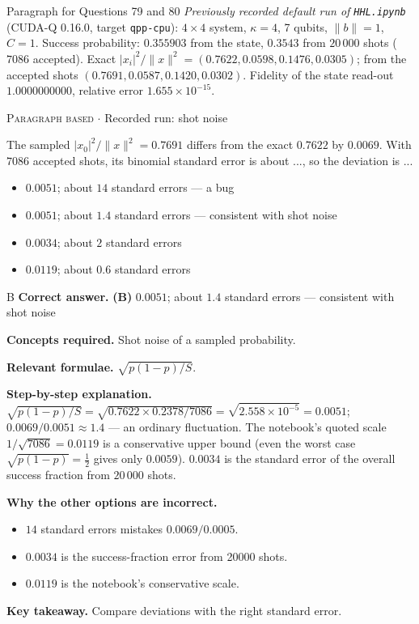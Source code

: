 \documentclass[11pt,a4paper]{article}
\newcommand{\optlabel}[1]{\textbf{(#1)}}
\newcommand{\correctlabel}[1]{\textcolor{okgreen}{\textbf{(#1)}\,\ding{51}}}
\newenvironment{qitem}[1]{\begin{list}{}{\setlength{\leftmargin}{3.3em}\setlength{\labelwidth}{3.1em}%
  \setlength{\labelsep}{0.2em}\setlength{\topsep}{3pt}\setlength{\parsep}{3pt}}\item[\textbf{Q.#1}\hfill]}{\end{list}}
\newcommand{\qsep}{\par\vspace{2pt}{\color{black!15}\hrule}\vspace{4pt}}
\newcommand{\qmeta}[2]{{\footnotesize\color{black!60}\textsc{#1} \;$\cdot$\; #2}\par}
\begin{document}
\begin{passagebox}{Paragraph for Questions 79 and 80}
\emph{Previously recorded default run of \texttt{HHL.ipynb}} (CUDA-Q 0.16.0, target \texttt{qpp-cpu}): $4\times4$ system, $\kappa = 4$, 7 qubits, $\|b\| = 1$, $C = 1$.
Success probability: $0.355903$ from the state, $0.3543$ from $20\,000$ shots ($7086$ accepted). Exact $|x_i|^2/\|x\|^2 = (0.7622, 0.0598, 0.1476, 0.0305)$; from the accepted shots
$(0.7691, 0.0587, 0.1420, 0.0302)$. Fidelity of the state read-out $1.0000000000$, relative error $1.655\times10^{-15}$.
\end{passagebox}
\begin{qitem}{79}
\qmeta{Paragraph based}{Recorded run: shot noise}
The sampled $|x_0|^2/\|x\|^2 = 0.7691$ differs from the exact $0.7622$ by $0.0069$. With $7086$ accepted shots, its binomial standard error is about ..., so the deviation is ...
\begin{itemize}[leftmargin=2.6em, labelsep=0.4em, itemsep=2pt, topsep=3pt]
\item[\optlabel{A}] $0.0051$; about $14$ standard errors --- a bug
\item[\correctlabel{B}] $0.0051$; about $1.4$ standard errors --- consistent with shot noise
\item[\optlabel{C}] $0.0034$; about $2$ standard errors
\item[\optlabel{D}] $0.0119$; about $0.6$ standard errors
\end{itemize}
\end{qitem}
\begin{solbox}{B}
\textbf{\color{brand}Correct answer.} \textcolor{okgreen}{\textbf{(B)}} $0.0051$; about $1.4$ standard errors --- consistent with shot noise

\textbf{\color{brand}Concepts required.} Shot noise of a sampled probability.

\textbf{\color{brand}Relevant formulae.} $\sqrt{p(1-p)/S}$.

\textbf{\color{brand}Step-by-step explanation.} $\sqrt{p(1 - p)/S} = \sqrt{0.7622\times0.2378/7086} = \sqrt{2.558\times10^{-5}} = 0.0051$; $0.0069/0.0051 \approx 1.4$ --- an ordinary fluctuation. The notebook's quoted scale $1/\sqrt{7086} = 0.0119$ is a conservative
upper bound (even the worst case $\sqrt{p(1 - p)} = \tfrac12$ gives only $0.0059$). $0.0034$ is the standard error of the overall success fraction from $20\,000$ shots.

\textbf{\color{brand}Why the other options are incorrect.}
\begin{itemize}[leftmargin=2.4em, itemsep=1pt, topsep=2pt]
\item[\textbf{(A)}] $14$ standard errors mistakes $0.0069/0.0005$.
\item[\textbf{(C)}] $0.0034$ is the success-fraction error from 20000 shots.
\item[\textbf{(D)}] $0.0119$ is the notebook's conservative scale.
\end{itemize}
\textbf{\color{brand}Key takeaway.} Compare deviations with the right standard error.
\end{solbox}
\qsep
\end{document}
